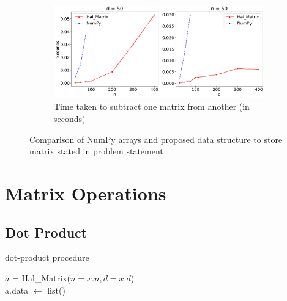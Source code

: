 \documentclass[11pt,twocolumn]{article}
\begin{document}
\begin{figure}[h!]
\begin{subfigure}{\linewidth}
        \label{img:mul}
    \end{subfigure}
    \begin{subfigure}{\linewidth}
        \includegraphics[width=\linewidth]{graphs/sub2.png}
        \caption{Time taken to subtract one matrix from another (in seconds)}
        \label{img:sub}
    \end{subfigure}
    \caption{Comparison of NumPy arrays and proposed data structure to store matrix stated in problem statement}
    \label{img:comparision}
\end{figure}


\section{Matrix Operations}

    \subsection{Dot Product}

        \begin{algorithm}[!h]
            \caption{dot-product procedure}
            \SetAlgoLined

            $a$ = Hal\_Matrix($n=x.n, d=x.d$)\\
            a.data $\leftarrow$ list() \\
        \end{algorithm}
\end{document}
